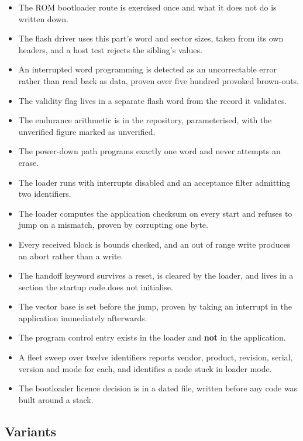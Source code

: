 \begin{itemize}
\item The ROM bootloader route is exercised once and what it does not do is
written down.
\item The flash driver uses this part's word and sector sizes, taken from its own
headers, and a host test rejects the sibling's values.
\item An interrupted word programming is detected as an uncorrectable error
rather than read back as data, proven over five hundred provoked brown-outs.
\item The validity flag lives in a separate flash word from the record it
validates.
\item The endurance arithmetic is in the repository, parameterised, with the
unverified figure marked as unverified.
\item The power-down path programs exactly one word and never attempts an erase.
\item The loader runs with interrupts disabled and an acceptance filter admitting
two identifiers.
\item The loader computes the application checksum on every start and refuses to
jump on a mismatch, proven by corrupting one byte.
\item Every received block is bounds checked, and an out of range write produces
an abort rather than a write.
\item The handoff keyword survives a reset, is cleared by the loader, and lives
in a section the startup code does not initialise.
\item The vector base is set before the jump, proven by taking an interrupt in
the application immediately afterwards.
\item The program control entry exists in the loader and \textbf{not} in the
application.
\item A fleet sweep over twelve identifiers reports vendor, product, revision,
serial, version and mode for each, and identifies a node stuck in loader mode.
\item The bootloader licence decision is in a dated file, written before any code
was built around a stack.
\end{itemize}

\subsection*{Variants}

